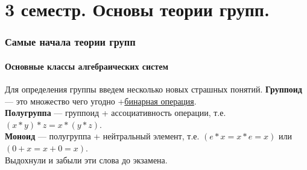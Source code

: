 \documentclass[12pt]{article}
\begin{document}
	\tableofcontents
	\newpage
	\part{3 семестр. Основы теории групп.}

	\section{Самые начала теории групп}
		

	\subsection{Основные классы алгебраических систем}
	Для определения группы введем несколько новых страшных понятий.
		\hypertarget{indef:gruppoid}{\textbf{Группоид}} — это множество чего угодно +\hyperref[def:bin_oper]{бинарная операция}. \\
		\hypertarget{indef:halfgroup}{\textbf{Полугруппа}} — группоид + ассоциативность операции, т.е. $(x*y)*z=x*(y*z)$. \\
		\hypertarget{indef:monoid}{\textbf{Моноид}} — полугруппа + нейтральный элемент, т.е. $(e*x=x*e=x)$ или $(0+x=x+0=x)$. \\
		Выдохнули и забыли эти слова до экзамена. \\
\end{document}
